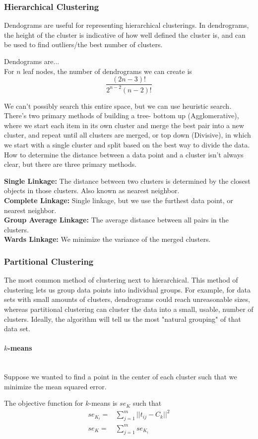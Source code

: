\documentclass{chezarticle}
\begin{document}
\subsubsection{Hierarchical Clustering}
Dendograms are useful for representing hierarchical clusterings. In dendrograms, the height of the cluster is indicative of how well defined the cluster is, and can be used to find outliers/the best number of clusters. 
\begin{definition}
Dendograms are...\\
For $n$ leaf nodes, the number of dendrograms we can create is
$$\frac{(2n-3)!}{2^{n-2}(n-2)!}$$
\end{definition}
We can't possibly search this entire space, but we can use heuristic search. There's two primary methods of building a tree- bottom up (Agglomerative), where we start each item in its own cluster and merge the best pair into a new cluster, and repeat until all clusters are merged, or top down (Divisive), in which we start with a single cluster and split based on the best way to divide the data. How to determine the distance between a data point and a cluster isn't always clear, but there are three primary methods.
\begin{definition}
\textbf{Single Linkage:} The distance between two clusters is determined by the closest objects in those clusters. Also known as nearest neighbor.\\
\textbf{Complete Linkage:} Single linkage, but we use the furthest data point, or nearest neighbor.\\
\textbf{Group Average Linkage:} The average distance between all pairs in the clusters.\\
\textbf{Wards Linkage:} We minimize the variance of the merged clusters.
\end{definition}
\subsubsection{Partitional Clustering}
The most common method of clustering next to hierarchical. This method of clustering lets us group data points into individual groups. For example, for data sets with small amounts of clusters, dendrograms could reach unreasonable sizes, whereas partitional clustering can cluster the data into a small, usable, number of clusters. Ideally, the algorithm will tell us the most "natural grouping" of that data set. 

\paragraph{$k$-means}\mbox{}\\
Suppose we wanted to find a point in the center of each cluster such that we minimize the mean squared error.
\begin{definition}
The objective function for $k$-means is $se_K$ such that
\begin{align*}
    se_{K_i} =& \sum_{j =1 }^{m} ||t_{ij} - C_k||^2 
    \\
    se_K =& \sum_{j=1}^{m} se_{K_i}
\end{align*}
\end{definition}
\end{document}
